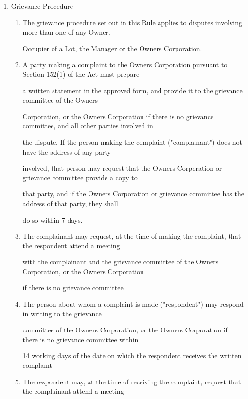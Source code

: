 \documentclass{article}
\begin{document}
\begin{enumerate}[label=\arabic*.]
\begin{enumerate}[label=\arabic{enumi}.\arabic*.]
\begin{enumerate}[label=(\arabic*)]
\end{enumerate}
\item  Grievance Procedure 

\begin{enumerate}[label=(\arabic*)]
\item  The grievance procedure set out in this Rule applies to disputes involving more than one of any Owner, 

Occupier of a Lot, the Manager or the Owners Corporation. 

\item  A party making a complaint to the Owners Corporation pursuant to Section 152(1) of the Act must prepare 

a written statement in the approved form, and provide it to the grievance committee of the Owners 

Corporation, or the Owners Corporation if there is no grievance committee, and all other parties involved in 

the dispute. If the person making the complaint ("complainant") does not have the address of any party 

\newpage

involved, that person may request that the Owners Corporation or grievance committee provide a copy to 

that party, and if the Owners Corporation or grievance committee has the address of that party, they shall 

do so within 7 days. 

\item  The complainant may request, at the time of making the complaint, that the respondent attend a meeting 

with the complainant and the grievance committee of the Owners Corporation, or the Owners Corporation 

if there is no grievance committee. 

\item  The person about whom a complaint is made ("respondent") may respond in writing to the grievance 

committee of the Owners Corporation, or the Owners Corporation if there is no grievance committee within 

14 working days of the date on which the respondent receives the written complaint. 

\item  The respondent may, at the time of receiving the complaint, request that the complainant attend a meeting 


\end{enumerate}
\end{enumerate}
\end{enumerate}
\end{document}
